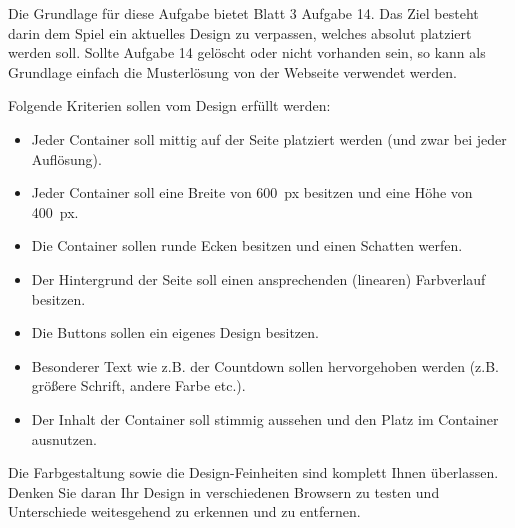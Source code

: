 %
\par Die Grundlage für diese Aufgabe bietet Blatt 3 Aufgabe 14. Das Ziel besteht darin dem Spiel ein aktuelles Design zu verpassen, welches absolut platziert werden soll. Sollte Aufgabe 14 gelöscht oder nicht vorhanden sein, so kann als Grundlage einfach die Musterlösung von der Webseite verwendet werden.
%
\par Folgende Kriterien sollen vom Design erfüllt werden:
%
\begin{itemize}
\item Jeder Container soll mittig auf der Seite platziert werden (und zwar bei jeder Auflösung).
\item Jeder Container soll eine Breite von \qty{600}{px} besitzen und eine Höhe von \qty{400}{px}.
\item Die Container sollen runde Ecken besitzen und einen Schatten werfen.
\item Der Hintergrund der Seite soll einen ansprechenden (linearen) Farbverlauf besitzen.
\item Die Buttons sollen ein eigenes Design besitzen.
\item Besonderer Text wie z.B. der Countdown sollen hervorgehoben werden (z.B. größere Schrift, andere Farbe etc.).
\item Der Inhalt der Container soll stimmig aussehen und den Platz im Container ausnutzen.
\end{itemize}
%
\par Die Farbgestaltung sowie die Design-Feinheiten sind komplett Ihnen überlassen. Denken Sie daran Ihr Design in verschiedenen Browsern zu testen und Unterschiede weitesgehend zu erkennen und zu entfernen.